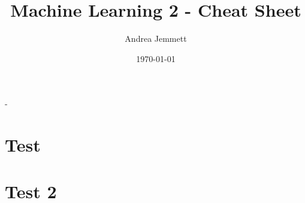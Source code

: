\documentclass[a4paper,twocolumn]{amsmlaj}
\author{Andrea Jemmett}
\title{Machine Learning 2 - Cheat Sheet}
\date{\today}
\makeatletter
\def\maketitle{
	\par\textbf{\@title}
	\par{\@author\quad-\quad\small{\@date}}
\par}
\makeatother
\begin{document}
\maketitle

\section{Test}
\lipsum[1]

\section{Test 2}
\lipsum[5-8]
\end{document}
